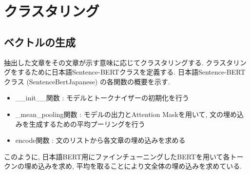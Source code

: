 
\section{クラスタリング}\label{clustering}
\subsection{ベクトルの生成}
抽出した文章をその文章が示す意味に応じてクラスタリングする. クラスタリングをするために日本語Sentence-BERTクラスを定義する. 日本語Sentence-BERTクラス (SentenceBertJapanese) の各関数の概要を示す. 
\begin{itemize}
  \item \_\_init\_\_関数 : モデルとトークナイザーの初期化を行う
  \item \_mean\_pooling関数 : モデルの出力とAttention Maskを用いて, 文の埋め込みを生成するための平均プーリングを行う
  \item encode関数 : 文のリストから各文章の埋め込みを求める
\end{itemize}

このように, 日本語BERT用にファインチューニングしたBERTを用いて各トークンの埋め込みを求め, 平均を取ることにより文全体の埋め込みを求めている. 





